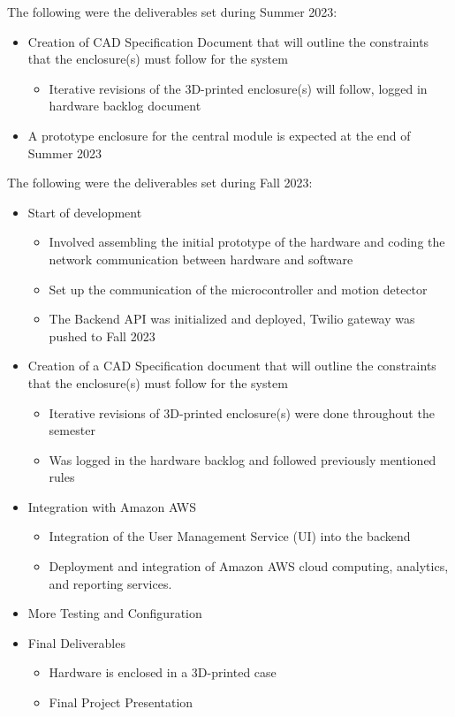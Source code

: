 The following were the deliverables set during Summer 2023:
\begin{itemize}
    \item Creation of CAD Specification Document that will outline the
          constraints that the enclosure(s) must follow for the system
          \begin{itemize}
              \item Iterative revisions of the 3D-printed enclosure(s) will follow, logged in hardware backlog document
          \end{itemize}
    \item A prototype enclosure for the central module is expected at the end of Summer 2023
\end{itemize}
\vfill
The following were the deliverables set during Fall 2023:
\begin{itemize}
    \item Start of development
          \begin{itemize}
              \item Involved assembling the initial prototype of the hardware and coding
                    the network communication between hardware and software
              \item Set up the communication of the microcontroller and motion detector
              \item The Backend API was initialized and deployed, Twilio gateway was pushed to Fall 2023
          \end{itemize}
    \item Creation of a CAD Specification document that will outline the constraints
          that the enclosure(s) must follow for the system
          \begin{itemize}
              \item Iterative revisions of 3D-printed enclosure(s) were done throughout the
                    semester
              \item Was logged in the hardware backlog and followed previously mentioned rules
          \end{itemize}
    \item Integration with Amazon AWS
          \begin{itemize}
              \item Integration of the User Management Service (UI) into the backend
              \item Deployment and integration of Amazon AWS cloud computing,
                    analytics, and reporting services.
          \end{itemize}
    \item More Testing and Configuration
    \item Final Deliverables
          \begin{itemize}
              \item Hardware is enclosed in a 3D-printed case
              \item Final Project Presentation
          \end{itemize}
\end{itemize}

